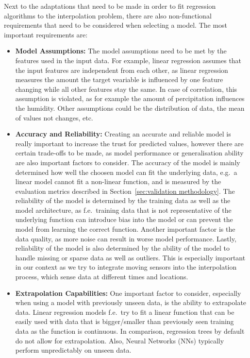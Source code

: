 Next to the adaptations that need to be made in order to fit regression algorithms to the interpolation problem, there are also non-functional requirements that need to be considered when selecting a model. The most important requirements are:

\begin{itemize}
    \item \textbf{Model Assumptions:} The model assumptions need to be met by the features used in the input data. For example, linear regression assumes that the input features are independent from each other, as linear regression measures the amount the target veariable is influenced by one feature changing while all other features stay the same. In case of correlation, this assumption is violated, as for example the amount of percipitation influences the humidity. Other assumptions could be the distribution of data, the mean of values not changes, etc.
    \item \textbf{Accuracy and Reliability:} Creating an accurate and reliable model is really important to increase the trust for predicted values, however there are certain trade-offs to be made, as model performance or generalisation ability are also important factors to consider.
    The accuracy of the model is mainly determined how well the choosen model can fit the underlying data, e.g.\ a linear model cannot fit a non-linear function, and is measured by the evaluation metrics described in Section~\ref{sec:validation methodology}.
    The reliability of the model is determined by the training data as well as the model architecture, as f.e.\ training data that is not representative of the underlying function can introduce bias into the model or can prevent the model from learning the correct function. Another important factor is the data quality, as more noise can result in worse model performance. Lastly, reliability of the model is also determined by the ability of the model to handle missing or sparse data as well as outliers. This is especially important in our context as we try to integrate moving sensors into the interpolation process, which sense data at different times and locations.
    \item \textbf{Extrapolation Capabilities:} One important factor to consider, especially when using a model with previously unseen data, is the ability to extrapolate data. Linear regression models f.e.\ try to fit a linear function that can be easily used with data that is bigger/smaller than previously seen training data as the function is continuous. In comparison, regression trees by default do not allow for extrapolation. Also, Neural Networks (NNs) typically perform unpredictably on unseen data.

\end{itemize}
